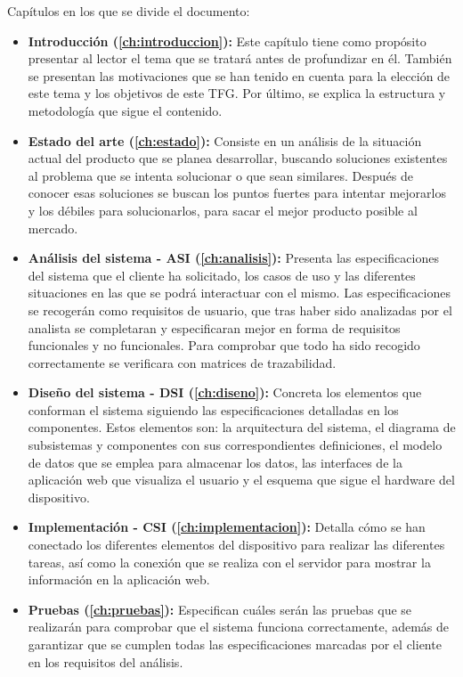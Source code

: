 Capítulos en los que se divide el documento:

\begin{itemize}
	\item \textbf{Introducción (\autoref{ch:introduccion}):} Este capítulo tiene como propósito presentar al lector el tema que se tratará antes de profundizar en él. También se presentan las motivaciones que se han tenido en cuenta para la elección de este tema y los objetivos de este TFG. Por último, se explica la estructura y metodología que sigue el contenido.
	\item \textbf{Estado del arte (\autoref{ch:estado}):} Consiste en un análisis de la situación actual del producto que se planea desarrollar, buscando soluciones existentes al problema que se intenta solucionar o que sean similares. Después de conocer esas soluciones se buscan los puntos fuertes para intentar mejorarlos y los débiles para solucionarlos, para sacar el mejor producto posible al mercado.
	\item \textbf{Análisis del sistema - ASI (\autoref{ch:analisis}):} Presenta las especificaciones del sistema que el cliente ha solicitado, los casos de uso y las diferentes situaciones en las que se podrá interactuar con el mismo. Las especificaciones se recogerán como requisitos de usuario, que tras haber sido analizadas por el analista se completaran y especificaran mejor en forma de requisitos funcionales y no funcionales. Para comprobar que todo ha sido recogido correctamente se verificara con matrices de trazabilidad.
	\item \textbf{Diseño del sistema - DSI (\autoref{ch:diseno}):} Concreta los elementos que conforman el sistema siguiendo las especificaciones detalladas en los componentes. Estos elementos son: la arquitectura del sistema, el diagrama de subsistemas y componentes con sus correspondientes definiciones, el modelo de datos que se emplea para almacenar los datos, las interfaces de la aplicación web que visualiza el usuario y el esquema que sigue el hardware del dispositivo. 
	\item \textbf{Implementación - CSI (\autoref{ch:implementacion}):} Detalla cómo se han conectado los diferentes elementos del dispositivo para realizar las diferentes tareas, así como la conexión que se realiza con el servidor para mostrar la información en la aplicación web.
	\item \textbf{Pruebas (\autoref{ch:pruebas}):} Especifican cuáles serán las pruebas que se realizarán para comprobar que el sistema funciona correctamente, además de garantizar que se cumplen todas las especificaciones marcadas por el cliente en los requisitos del análisis.
	\pagebreak
	

\end{itemize}
